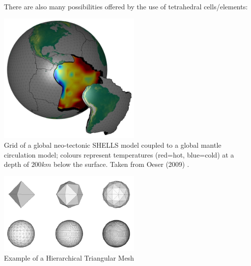 There are also many possibilities offered by the use of tetrahedral cells/elements:


\begin{center}
\includegraphics[width=7cm]{images/meshes/oebm09}\\
{\captionfont Grid of a global neo-tectonic SHELLS model coupled to a global mantle
circulation model; colours represent temperatures (red=hot, blue=cold)
at a depth of $200\si{km}$ below the surface. Taken from Oeser \etal (2009) \cite{oebm09}.}
\end{center}


\begin{center}
\includegraphics[width=7cm]{images/meshes/htm}\\
{\captionfont Example of a Hierarchical Triangular Mesh}
\end{center}



